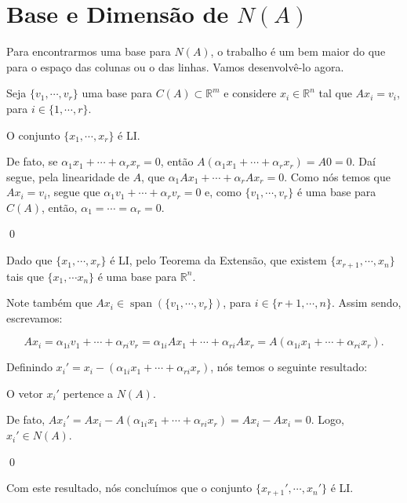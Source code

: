 \section{Base e Dimensão de $N(A)$}

Para encontrarmos uma base para $N(A)$, o trabalho é um bem maior do que para o espaço das colunas ou o das linhas. Vamos desenvolvê-lo agora.

Seja $\{v_1, \cdots, v_r\}$ uma base para $C(A)\subset\mathbb{R}^m$ e considere $x_i\in\mathbb{R}^n$ tal que $Ax_i = v_i$, para $i\in\{1, \cdots, r\}$.

\begin{Lemma}\label{lemma-5.6.1}
	O conjunto $\{x_1, \cdots, x_r\}$ é LI.
\end{Lemma}

\begin{Proof}
	De fato, se $\alpha_1x_1 + \cdots + \alpha_rx_r = 0$, então $A(\alpha_1x_1 + \cdots + \alpha_rx_r) = A0 = 0$. Daí segue, pela linearidade de $A$, que $\alpha_1Ax_1 + \cdots + \alpha_rAx_r = 0$. Como nós temos que $Ax_i = v_i$, segue que $\alpha_1v_1 + \cdots + \alpha_rv_r = 0$ e, como $\{v_1, \cdots, v_r\}$ é uma base para $C(A)$, então, $\alpha_1 = \cdots = \alpha_r = 0$.
	
	\qed
\end{Proof}

Dado que $\{x_1, \cdots, x_r\}$ é LI, pelo Teorema da Extensão, que existem $\{x_{r + 1}, \cdots, x_n\}$ tais que $\{x_1, \cdots x_n\}$ é uma base para $\mathbb{R}^n$.

Note também que $Ax_i\in\operatorname{span}(\{v_1, \cdots, v_r\})$, para $i\in\{r + 1, \cdots, n\}$. Assim sendo, escrevamos:

$$
Ax_i = \alpha_{1i}v_1 + \cdots + \alpha_{ri}v_r = \alpha_{1i}Ax_1 + \cdots + \alpha_{ri}Ax_r = A(\alpha_{1i}x_1 + \cdots + \alpha_{ri}x_r).
$$

Definindo $x_i' = x_i - (\alpha_{1i}x_1 + \cdots + \alpha_{ri}x_r)$, nós temos o seguinte resultado:

\begin{Lemma}
	O vetor $x_i'$ pertence a $N(A)$.
\end{Lemma}

\begin{Proof}
	De fato, $Ax_i' = Ax_i - A(\alpha_{1i}x_1 + \cdots + \alpha_{ri}x_r) = Ax_i - Ax_i = 0$. Logo, $x_i'\in N(A)$.
	
	\qed
\end{Proof}

Com este resultado, nós concluímos que o conjunto $\{x_{r + 1}', \cdots, x_n'\}$ é LI.

